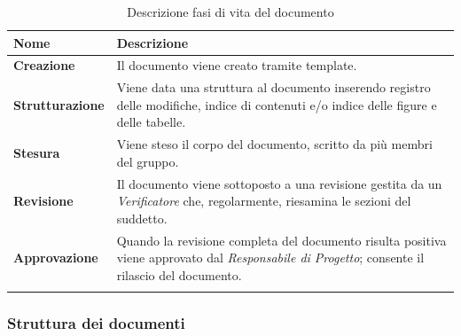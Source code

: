 {
	\setlength{\freewidth}{\dimexpr\textwidth-1\tabcolsep}
	\renewcommand{\arraystretch}{1.5}
	\setlength{\aboverulesep}{0pt}
	\setlength{\belowrulesep}{0pt}
	\begin{longtable}{L{.210\freewidth} L{.68\freewidth}}
		\textbf{Nome} & \textbf{Descrizione} \\
		\toprule
		\endhead		
		\textbf{Creazione} & Il documento viene creato tramite template. \\ 
		\textbf{Strutturazione} & Viene data una struttura al documento inserendo registro delle modifiche, indice di contenuti e/o indice delle figure e delle tabelle.\\
		\textbf{Stesura} & Viene steso il corpo del documento, scritto da più membri del gruppo. \\ 
		\textbf{Revisione} & Il documento viene sottoposto a una revisione gestita da un \textit{Verificatore} che, regolarmente, riesamina le sezioni del suddetto. \\
		\textbf{Approvazione} & Quando la revisione completa del documento risulta positiva viene approvato dal \textit{Responsabile di Progetto}; consente il rilascio del documento. \\ 	
				
		\bottomrule
		\hiderowcolors
		\caption{Descrizione fasi di vita del documento}
	\end{longtable}
	
	
\subsubsection*{Struttura dei documenti}
}

